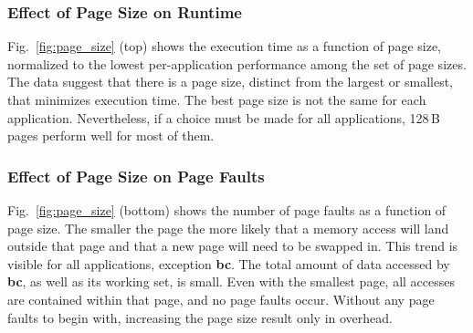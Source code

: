 \subsubsection{Effect of Page Size on Runtime}
%
Fig.~\ref{fig:page_size} (top) shows the execution time as a function
of page size, normalized to the lowest per-application performance among the
set of page sizes.
The data suggest that there is a page size, distinct from the largest or
smallest, that minimizes execution time. The best page size is not the same for
each application. Nevertheless, if a choice must be made for all applications,
128\,B pages perform well for most of them.
%
\subsubsection{Effect of Page Size on Page Faults}
%
Fig.~\ref{fig:page_size} (bottom) shows the number of page faults as a
function of page size.
%
The smaller the page the more likely that a memory access will land
outside that page and that a new page will need to be swapped in.
%
This trend is visible for all applications, exception \textbf{bc}. The total
amount of data accessed by \textbf{bc}, as well as its working set, is small.
Even with the smallest page, all accesses are contained within that page, and
no page faults occur. Without any page faults to begin with, increasing the
page size result only in overhead.